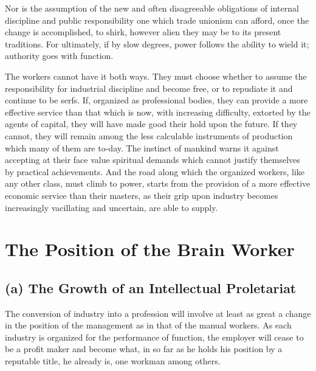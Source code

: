 \documentclass{book}
\begin{document}
Nor is the assumption of the new and often disagreeable obligations of internal discipline and public responsibility one which trade unionism can afford, once the change is accomplished, to shirk, however alien they may be to its present traditions. For ultimately, if by slow degrees, power follows the ability to wield it; authority goes with function.

The workers cannot have it both ways. They must choose whether to assume the responsibility for industrial discipline and become free, or to repudiate it and continue to be serfs. If, organized as professional bodies, they can provide a more effective service than that which is now, with increasing difficulty, extorted by the agents of capital, they will have made good their hold upon the future. If they cannot, they will remain among the less calculable instruments of production which many of them are to-day. The instinct of mankind warns it against accepting at their face value spiritual demands which cannot justify themselves by practical achievements. And the road along which the organized workers, like any other class, must climb to power, starts from the provision of a more effective economic service than their masters, as their grip upon industry becomes increasingly vacillating and uncertain, are able to supply.

\chapter{The Position of the Brain Worker}
\label{chapter-9}
\section{(a) The Growth of an Intellectual Proletariat}
The conversion of industry into a profession will involve at least as great a change in the position of the management as in that of the manual workers. As each industry is organized for the performance of function, the employer will cease to be a profit maker and become what, in so far as he holds his position by a reputable title, he already is, one workman among others.
\end{document}
